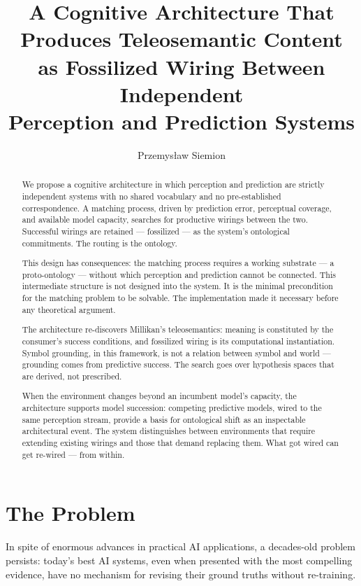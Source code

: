 \documentclass[12pt, a4paper]{article}
\title{A Cognitive Architecture That Produces Teleosemantic Content\\
as Fossilized Wiring Between Independent\\
Perception and Prediction Systems}
\author{Przemys\l{}aw Siemion}
\date{}
\begin{document}
\maketitle

\begin{abstract}
We propose a cognitive architecture in which perception and prediction
are strictly independent systems with no shared vocabulary and no
pre-established correspondence. A matching process, driven by prediction
error, perceptual coverage, and available model capacity, searches for
productive wirings between the two. Successful wirings are retained ---
fossilized --- as the system's ontological commitments. The routing is
the ontology.

This design has consequences: the matching process requires a working
substrate --- a proto-ontology --- without which perception and prediction
cannot be connected. This intermediate structure is not designed into
the system. It is the minimal precondition for the matching problem to
be solvable. The implementation made it necessary before any theoretical
argument.

The architecture re-discovers Millikan's teleosemantics: meaning is
constituted by the consumer's success conditions, and fossilized wiring
is its computational instantiation. Symbol grounding, in this framework,
is not a relation between symbol and world --- grounding comes from
predictive success. The search goes over hypothesis spaces that are
derived, not prescribed.

When the environment changes beyond an incumbent model's capacity, the
architecture supports model succession: competing predictive models,
wired to the same perception stream, provide a basis for ontological
shift as an inspectable architectural event. The system distinguishes
between environments that require extending existing wirings and those
that demand replacing them. What got wired can get re-wired --- from
within.
\end{abstract}

\section{The Problem}

In spite of enormous advances in practical AI applications, a
decades-old problem persists: today's best AI systems, even when
presented with the most compelling evidence, have no mechanism for
revising their ground truths without re-training.
\end{document}
